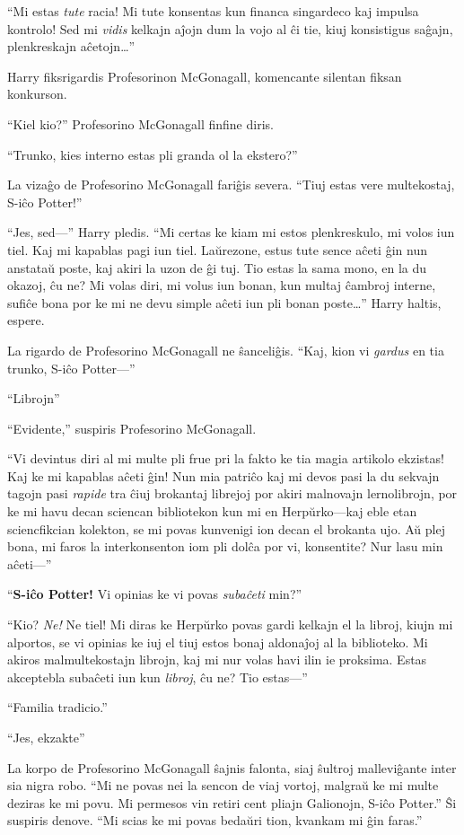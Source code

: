 ``Mi estas \emph{tute} racia! Mi tute konsentas kun financa singardeco
kaj impulsa kontrolo! Sed mi \emph{vidis} kelkajn aĵojn dum la vojo al ĉi
tie, kiuj konsistigus saĝajn, plenkreskajn aĉetojn\ldots''

Harry fiksrigardis Profesorinon McGonagall, komencante silentan fiksan
konkurson.

``Kiel kio?'' Profesorino McGonagall finfine diris.

``Trunko, kies interno estas pli granda ol la ekstero?''

La vizaĝo de Profesorino McGonagall fariĝis severa. ``Tiuj estas vere
multekostaj, S-iĉo Potter!''

``Jes, sed—'' Harry pledis. ``Mi certas ke kiam mi estos plenkreskulo, mi
volos iun tiel. Kaj mi kapablas pagi iun tiel. Laŭrezone, estus tute
sence aĉeti ĝin nun anstataŭ poste, kaj akiri la uzon de ĝi
tuj. Tio estas la sama mono, en la du okazoj, ĉu ne?  Mi volas diri, mi volus
iun bonan, kun multaj ĉambroj interne, sufiĉe bona por ke mi ne devu
simple aĉeti iun pli bonan poste\ldots'' Harry haltis, espere.

La rigardo de Profesorino McGonagall ne ŝanceliĝis. ``Kaj, kion vi
\emph{gardus} en tia trunko, S-iĉo Potter—''

``Librojn''

``Evidente,'' suspiris Profesorino McGonagall.

``Vi devintus diri al mi multe pli frue pri la fakto ke tia magia
artikolo ekzistas! Kaj ke mi kapablas aĉeti ĝin! Nun mia patriĉo kaj mi
devos pasi la du sekvajn tagojn pasi \emph{rapide} tra ĉiuj brokantaj
librejoj por akiri malnovajn lernolibrojn, por ke mi havu decan
sciencan bibliotekon kun mi en Herpŭrko—kaj eble etan sciencfikcian
kolekton, se mi povas kunvenigi ion decan el brokanta ujo. Aŭ plej bona,
mi faros la interkonsenton iom pli dolĉa por vi, konsentite? Nur lasu
min aĉeti—''

``\textbf{S-iĉo Potter!} Vi opinias ke vi povas \emph{subaĉeti} min?''

``Kio? \emph{Ne!} Ne tiel! Mi diras ke Herpŭrko povas gardi kelkajn el
la libroj, kiujn mi alportos, se vi opinias ke iuj el tiuj estos bonaj
aldonaĵoj al la biblioteko. Mi akiros malmultekostajn librojn, kaj mi
nur volas havi ilin ie proksima. Estas akceptebla subaĉeti iun kun
\emph{libroj}, ĉu ne? Tio estas—''

``Familia tradicio.''

``Jes, ekzakte''

La korpo de Profesorino McGonagall ŝajnis falonta, siaj ŝultroj
malleviĝante inter sia nigra robo. ``Mi ne povas nei la sencon de viaj
vortoj, malgraŭ ke mi multe deziras ke mi povu. Mi permesos vin
retiri cent pliajn Galionojn, S-iĉo Potter.'' Ŝi suspiris denove. ``Mi
scias ke mi povas bedaŭri tion, kvankam mi ĝin faras.''

